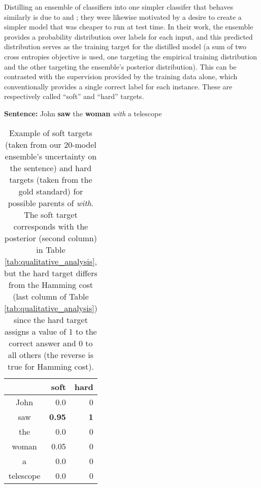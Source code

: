 \documentclass[11pt,letterpaper]{article}
\newcommand{\ignore}[1]{}
\newcommand{\nascomment}[1]{\ignore{\textcolor{blue}{{\textbf{[#1 --\textsc{nas}]}}}}}
\newcommand{\miguelcomment}[1]{\ignore{\textcolor{red}{{\textbf{[#1 --\textsc{miguel}]}}}}}
\begin{document}
Distilling an ensemble of classifiers into one simpler classifer that behaves similarly is due to  and ; they were likewise motivated by a desire to create a simpler model that was cheaper to run at test time.  In their work, the ensemble provides a probability distribution over labels for each input, and this predicted distribution serves as the training target for the distilled model (a sum of two cross entropies objective is used, one targeting the empirical training distribution and the other targeting the ensemble's posterior distribution).
This can be contrasted with the supervision provided by the training data alone, which conventionally provides a single correct label for each instance.  These are respectively called ``soft'' and ``hard'' targets.

\begin{table}[!ht]
\ignore{\miguelcomment{Same here}}
 \textbf{Sentence: }John \textbf{saw} the \textbf{woman} \emph{with} a telescope
\begin{center} \begin{tabular}{|c|r|r|} \hline
                                & soft  & hard                        \\ \hline
John                                              & 0.0 & 0 \\ 
 saw                                               & \textbf{0.95} &  \textbf{1}                                                   \\
the & 0.0 & 0 \\
woman                                             & 0.05  &  0                                                 \\
a & 0.0 & 0 \\
telescope & 0.0 & 0 \\
\hline                                                
\end{tabular}
\end{center}
\caption{Example of soft targets (taken from \ignore{\nascomment{check that this is actually what our model does, or fix}} our 20-model ensemble's uncertainty on the sentence) and hard targets (taken from the gold standard) for possible parents of \emph{with}. The soft target corresponds with the posterior (second column) in Table \ref{tab:qualitative_analysis}, but the hard target differs from the Hamming cost (last column of Table \ref{tab:qualitative_analysis}) since the hard target assigns a value of 1 to the correct answer and 0 to all others (the reverse is true for Hamming cost).
\label{tab:soft_hard_targets}}
\end{table}
\end{document}
